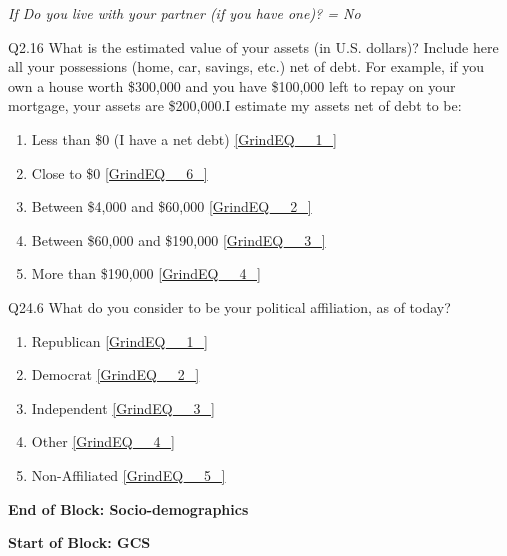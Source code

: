 \documentclass{article} %
\begin{document}
\textit{If Do you live with your partner (if you have one)? = No}

\noindent 

\noindent Q2.16 What is the\textbf{ }estimated\textbf{ }value\textbf{ }of\textbf{ }your\textbf{ }assets (in U.S. dollars)? Include here all your possessions (home, car, savings, etc.) net of debt. For example, if you own a house worth \$300,000 and you have \$100,000 left to repay on your mortgage, your assets are \$200,000.I estimate my assets net of debt to be:~

\begin{enumerate}
\item  Less than \$0 (I have a net debt)  \eqref{GrindEQ__1_} 

\item  Close to \$0  \eqref{GrindEQ__6_} 

\item  Between \$4,000 and \$60,000  \eqref{GrindEQ__2_} 

\item  Between \$60,000 and \$190,000  \eqref{GrindEQ__3_} 

\item  More than \$190,000  \eqref{GrindEQ__4_} 
\end{enumerate}

\noindent 

\noindent 

\noindent 

\noindent Q24.6 What do you consider to be your political affiliation, as of today?

\begin{enumerate}
\item  Republican  \eqref{GrindEQ__1_} 

\item  Democrat  \eqref{GrindEQ__2_} 

\item  Independent  \eqref{GrindEQ__3_} 

\item  Other  \eqref{GrindEQ__4_} 

\item  Non-Affiliated  \eqref{GrindEQ__5_} 
\end{enumerate}

\noindent 

\noindent \textbf{End of Block: Socio-demographics}

\noindent \textbf{}

\noindent \textbf{Start of Block: GCS}
\end{document}
